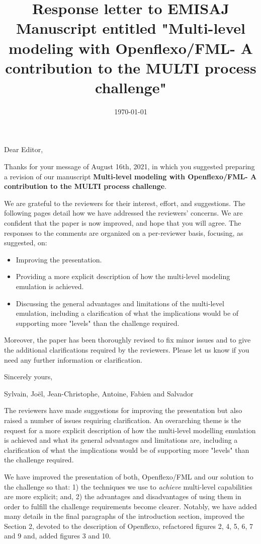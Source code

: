\documentclass[10pt]{article}
\title{Response letter to EMISAJ Manuscript entitled "Multi-level modeling with Openflexo/FML- A contribution to the MULTI process challenge"}
\date{\today}
\begin{document}
Dear Editor,

\bigskip
Thanks for your message of August 16th, 2021, in which you suggested preparing a revision of our manuscript  \textbf{Multi-level modeling with Openflexo/FML- A contribution to the MULTI process challenge}.

\bigskip
We are grateful to the reviewers for their interest, effort, and suggestions. The  following pages detail how we have addressed the reviewers' concerns. We are confident that the paper is now improved, and hope that you will agree. The responses to the comments are organized on a per-reviewer basis, focusing, as suggested, on:

\begin{itemize}
\item Improving the presentation.
\item Providing a more explicit description of how the multi-level modeling emulation is achieved.
\item Discussing the general advantages and limitations of the multi-level emulation, including a clarification of what the implications would be of supporting more "levels" than the challenge required.
\end{itemize}

Moreover, the paper has been thoroughly revised to fix minor issues and to give the additional clarifications required by the reviewers. Please let us know if you need any further information or clarification.

\bigskip
Sincerely yours,

\bigskip
Sylvain, Joël, Jean-Christophe, Antoine, Fabien and Salvador

\pagebreak

\Editor{}

\begin{response}{The reviewers have made suggestions for improving the presentation but also raised a number of issues requiring clarification. An overarching theme is the request for a more explicit description of how the multi-level modelling emulation is achieved and what its general advantages and limitations are, including a clarification of what the implications would be of supporting more "levels" than the challenge required.}

We have improved the presentation of both, Openflexo/FML and our solution to the challenge so that: 1) the techniques we use to \emph{achieve} multi-level capabilities are more explicit; and, 2) the advantages and disadvantages of using them in order to fulfill the challenge requirements become clearer. Notably, we have added many details in the final paragraphs of the introduction section, improved the Section 2, devoted to the description of Openflexo, refactored figures 2, 4, 5, 6, 7 and 9 and, added figures 3 and 10.
\end{response}
\end{document}
